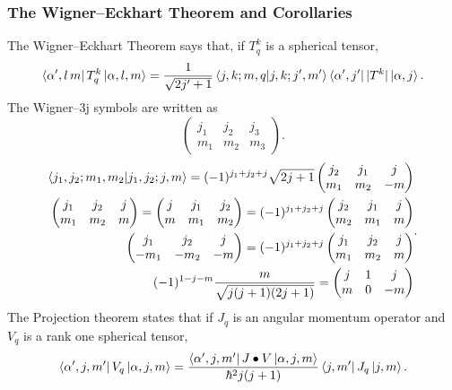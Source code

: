 \documentclass{article}
\begin{document}
    \subsubsection*{The Wigner--Eckhart Theorem and Corollaries}
      The Wigner--Eckhart Theorem says that, if $T_q^k$ is a spherical tensor,
      \[
        \bra{\alpha',l\,m}T_q^k\ket{\alpha ,l,m} = \frac{1}{\sqrt{2 j' + 1}}
      \bra{j,k;m,q}\ket{j,k;j',m'}\bra{\alpha',j'}|T^k|\ket{\alpha,j}
      .\] 
      The Wigner--3j symbols are written as 
      \[
      \begin{pmatrix}
        j_1 & j_2 & j_3 \\
        m_1 & m_2 & m_3
      \end{pmatrix}
      .\] 
      \[
        \begin{split}
          \bra{j_1,j_2;m_1,m_2}\ket{j_1,j_2;j,m} = (-1)^{j_1+j_2+j} \sqrt{2j+1}
          \begin{pmatrix}
            j_2 & j_1 & j \\
            m_1 & m_2 & -m
          \end{pmatrix} \\
          \begin{pmatrix}
            j_1 & j_2 & j \\
            m_1 & m_2 & m 
          \end{pmatrix} = 
          \begin{pmatrix}
            j & j_1 & j_2 \\
            m & m_1 & m_2 
          \end{pmatrix} = (-1)^{j_1 + j_2 + j} 
          \begin{pmatrix}
            j_2 & j_1 &j \\
            m_2 & m_1 & m
          \end{pmatrix} \\
          \begin{pmatrix}
            j_1 & j_2 & j \\
            -m_1 & -m_2 & -m 
          \end{pmatrix} = (-1)^{j_1 + j_2 + j}
          \begin{pmatrix}
            j_1 & j_2 & j \\
            m_1 & m_2 & m
          \end{pmatrix} \\
          (-1)^{1 - j - m}\frac{m}{\sqrt{j(j+1)(2j+1)}} = 
          \begin{pmatrix}
            j & 1 & j \\
            m & 0 & -m
          \end{pmatrix}
        \end{split}
      .\] 
      The Projection theorem states that if $J_q$ is an angular momentum 
      operator  and  $V_q$ is a rank one spherical tensor, 
      \[
        \bra{\alpha',j,m'}V_q\ket{\alpha,j,m} = 
        \frac{\bra{\alpha',j,m'}J\bullet V\ket{\alpha,j,m}}{\hbar^2 j(j+1)}
        \bra{j,m'}J_q\ket{j,m}
      .\] 
      

\end{document}

